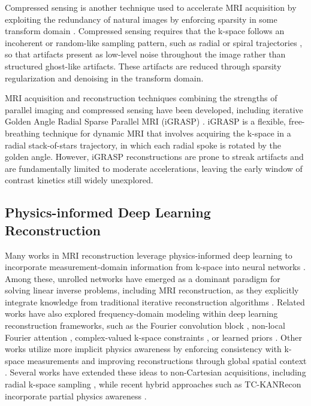 \documentclass[runningheads]{llncs}
\begin{document}
Compressed sensing is another technique used to accelerate MRI acquisition by exploiting the redundancy of natural images by enforcing sparsity in some transform domain \cite{Ye2019Compressed}. Compressed sensing requires that the k-space follows an incoherent or random-like sampling pattern, such as radial \cite{radialstackofstars} or spiral trajectories \cite{Tan2009SpiralTrajectory}, so that artifacts present as low-level noise throughout the image rather than structured ghost-like artifacts. These artifacts are reduced through sparsity regularization and denoising in the transform domain. 

MRI acquisition and reconstruction techniques combining the strengths of parallel imaging and compressed sensing have been developed, including iterative Golden Angle Radial Sparse Parallel MRI (iGRASP) \cite{Feng2014Golden}. iGRASP is a flexible, free-breathing technique for dynamic MRI that involves acquiring the k-space in a radial stack-of-stars trajectory, in which each radial spoke is rotated by the golden angle. However, iGRASP reconstructions are prone to streak artifacts and are fundamentally limited to moderate accelerations, leaving the early window of contrast kinetics still widely unexplored.




\subsection{Physics-informed Deep Learning Reconstruction}

Many works in MRI reconstruction leverage physics-informed deep learning to incorporate measurement-domain information from k-space into neural networks \cite{Wang2024KnowledgeDrivenFastMRI}. Among these, unrolled networks have emerged as a dominant paradigm for solving linear inverse problems, including MRI reconstruction, as they explicitly integrate knowledge from traditional iterative reconstruction algorithms \cite{Chen2025UnrolledInverseProblems,10629179,Ramzi2022NCPDNet,Kofler2021EndToEndRadialCineMRI}. Related works have also explored frequency-domain modeling within deep learning reconstruction frameworks, such as the Fourier convolution block \cite{SUN2025103349}, non-local Fourier attention \cite{ZHOU2023104632}, complex-valued k-space constraints \cite{10412627}, or learned priors \cite{Liu2020AutoencodingPriorsMRI}. Other works utilize more implicit physics awareness by enforcing consistency with k-space measurements and improving reconstructions through global spatial context \cite{10075478,10629179}. Several works have extended these ideas to non-Cartesian acquisitions, including radial k-space sampling \cite{s22197277}, while recent hybrid approaches such as TC-KANRecon incorporate partial physics awareness \cite{Ge2025TCKANRecon}.
\end{document}

